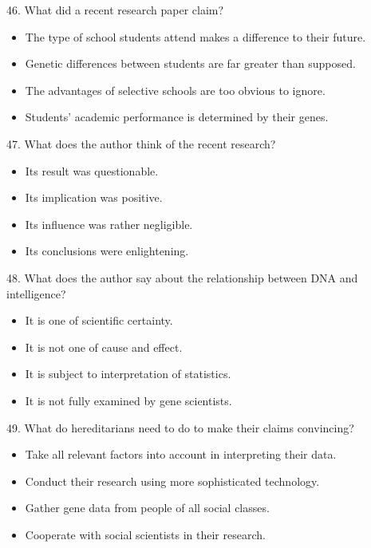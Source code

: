 \documentclass[UTF8,11pt]{ctexart}
\begin{document}
46. What did a recent research paper claim?


\begin{itemize}[leftmargin=2em,itemsep=.2em,topsep=.4em]\item[A.] The type of school students attend makes a difference to their future.
\item[B.] Genetic differences between students are far greater than supposed.
\item[C.] The advantages of selective schools are too obvious to ignore.
\item[D.] Students' academic performance is determined by their genes.
\end{itemize}

47. What does the author think of the recent research?


\begin{itemize}[leftmargin=2em,itemsep=.2em,topsep=.4em]\item[A.] Its result was questionable.
\item[B.] Its implication was positive.
\item[C.] Its influence was rather negligible.
\item[D.] Its conclusions were enlightening.
\end{itemize}

48. What does the author say about the relationship between DNA and intelligence?


\begin{itemize}[leftmargin=2em,itemsep=.2em,topsep=.4em]\item[A.] It is one of scientific certainty.
\item[B.] It is not one of cause and effect.
\item[C.] It is subject to interpretation of statistics.
\item[D.] It is not fully examined by gene scientists.
\end{itemize}

49. What do hereditarians need to do to make their claims convincing?


\begin{itemize}[leftmargin=2em,itemsep=.2em,topsep=.4em]\item[A.] Take all relevant factors into account in interpreting their data.
\item[B.] Conduct their research using more sophisticated technology.
\item[C.] Gather gene data from people of all social classes.
\item[D.] Cooperate with social scientists in their research.
\end{itemize}
\end{document}

